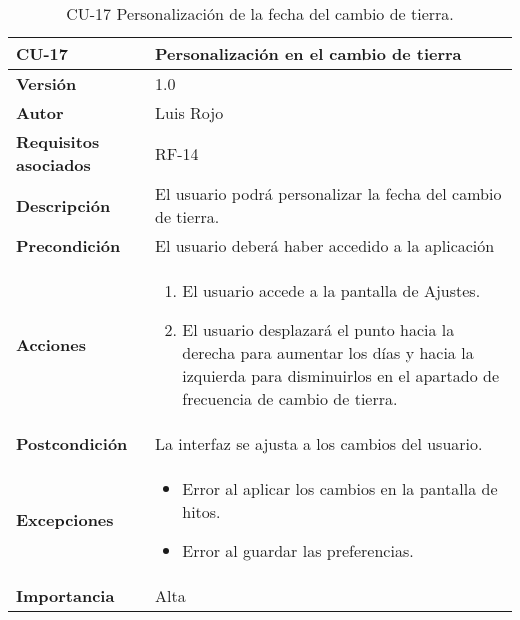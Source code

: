 \begin{table}[p]
	\centering
	\begin{tabularx}{\linewidth}{ p{} p{} }
		\toprule
		\textbf{CU-17}    & \textbf{Personalización en el cambio de tierra}\\
		\toprule
		\textbf{Versión}              & 1.0    \\
		\textbf{Autor}                & Luis Rojo \\
		\textbf{Requisitos asociados} & RF-14 \\
		\textbf{Descripción}          & El usuario podrá personalizar la fecha del cambio de tierra. \\
		\textbf{Precondición}         &  El usuario deberá haber accedido a la aplicación \\
		\textbf{Acciones}             &
		\begin{enumerate}
			\def\labelenumi{\arabic{enumi}.}
			\tightlist
			\item El usuario accede a la pantalla de Ajustes.
                \item El usuario desplazará el punto hacia la derecha para aumentar los días y hacia la izquierda para disminuirlos en el apartado de frecuencia de cambio de tierra.
		\end{enumerate}\\
		\textbf{Postcondición}        & La interfaz se ajusta a los cambios del usuario.  \\
		\textbf{Excepciones}          &  
            \begin{itemize}
                \item Error al aplicar los cambios en la pantalla de hitos.
                \item Error al guardar las preferencias.
            \end{itemize}
           \\
		\textbf{Importancia}          & Alta  \\
		\bottomrule
	\end{tabularx}
	\caption{CU-17 Personalización de la fecha del cambio de tierra.}
\end{table}

